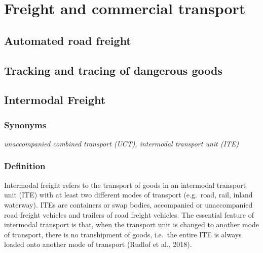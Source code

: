 \documentclass[
]{book}
\begin{document}
\hypertarget{freight}{%
\chapter{Freight and commercial transport}\label{freight}}

\hypertarget{automated_road_freight}{%
\section{Automated road freight}\label{automated_road_freight}}

\hypertarget{dangerous_goods}{%
\section{Tracking and tracing of dangerous goods}\label{dangerous_goods}}

\hypertarget{intermodal_freight}{%
\section{Intermodal Freight}\label{intermodal_freight}}

\hypertarget{synonyms-17}{%
\subsection*{Synonyms}\label{synonyms-17}}

\emph{unaccompanied combined transport (UCT), intermodal transport unit (ITE)}

\hypertarget{definition-19}{%
\subsection*{Definition}\label{definition-19}}

Intermodal freight refers to the transport of goods in an intermodal transport unit (ITE) with at least two different modes of transport (e.g.~road, rail, inland waterway). ITEs are containers or swap bodies, accompanied or unaccompanied road freight vehicles and trailers of road freight vehicles. The essential feature of intermodal transport is that, when the transport unit is changed to another mode of transport, there is no transhipment of goods, i.e.~the entire ITE is always loaded onto another mode of transport (Rudlof et al., 2018).
\end{document}

